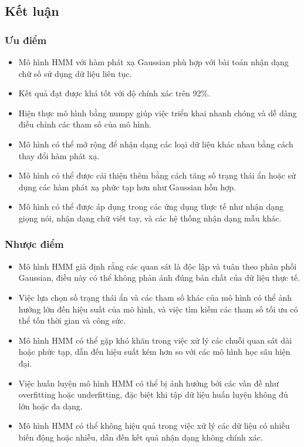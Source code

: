\subsection{Kết luận}
\subsubsection{Ưu điểm}
\begin{itemize}
    \item Mô hình HMM với hàm phát xạ Gaussian phù hợp với bài toán nhận dạng chữ số sử dụng dữ liệu liên tục.
    \item Kết quả đạt được khá tốt với độ chính xác trên 92\%.
    \item Hiện thực mô hình bằng numpy giúp việc triển khai nhanh chóng và dễ dàng điều chỉnh các tham số của mô hình.
    \item Mô hình có thể mở rộng để nhận dạng các loại dữ liệu khác nhau bằng cách thay đổi hàm phát xạ.
    \item Mô hình có thể được cải thiện thêm bằng cách tăng số trạng thái ẩn hoặc sử dụng các hàm phát xạ phức tạp hơn như Gaussian hỗn hợp.
    \item Mô hình có thể được áp dụng trong các ứng dụng thực tế như nhận dạng giọng nói, nhận dạng chữ viết tay, và các hệ thống nhận dạng mẫu khác.
\end{itemize}
\subsubsection{Nhược điểm}
\begin{itemize}
    \item Mô hình HMM giả định rằng các quan sát là độc lập và tuân theo phân phối Gaussian, điều này có thể không phản ánh đúng bản chất của dữ liệu thực tế.
    \item Việc lựa chọn số trạng thái ẩn và các tham số khác của mô hình có thể ảnh hưởng lớn đến hiệu suất của mô hình, và việc tìm kiếm các tham số tối ưu có thể tốn thời gian và công sức.
    \item Mô hình HMM có thể gặp khó khăn trong việc xử lý các chuỗi quan sát dài hoặc phức tạp, dẫn đến hiệu suất kém hơn so với các mô hình học sâu hiện đại.
    \item Việc huấn luyện mô hình HMM có thể bị ảnh hưởng bởi các vấn đề như overfitting hoặc underfitting, đặc biệt khi tập dữ liệu huấn luyện không đủ lớn hoặc đa dạng.
    \item Mô hình HMM có thể không hiệu quả trong việc xử lý các dữ liệu có nhiều biến động hoặc nhiễu, dẫn đến kết quả nhận dạng không chính xác.
\end{itemize}